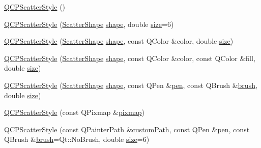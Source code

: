 \begin{DoxyCompactItemize}
\item 
\hyperlink{class_q_c_p_scatter_style_a8836018d9ad83ccd8870de8315c1be73}{Q\+C\+P\+Scatter\+Style} ()
\item 
\hyperlink{class_q_c_p_scatter_style_a003d92f74f4561eda111862eadd62f28}{Q\+C\+P\+Scatter\+Style} (\hyperlink{class_q_c_p_scatter_style_adb31525af6b680e6f1b7472e43859349}{Scatter\+Shape} \hyperlink{class_q_c_p_scatter_style_a4462a25ef17769631f4e0aa81dadca4b}{shape}, double \hyperlink{class_q_c_p_scatter_style_a1973ee650368f1c5f55507b78473f634}{size}=6)
\item 
\hyperlink{class_q_c_p_scatter_style_afa059da858c864c7e05871dc602d7eab}{Q\+C\+P\+Scatter\+Style} (\hyperlink{class_q_c_p_scatter_style_adb31525af6b680e6f1b7472e43859349}{Scatter\+Shape} \hyperlink{class_q_c_p_scatter_style_a4462a25ef17769631f4e0aa81dadca4b}{shape}, const Q\+Color \&color, double \hyperlink{class_q_c_p_scatter_style_a1973ee650368f1c5f55507b78473f634}{size})
\item 
\hyperlink{class_q_c_p_scatter_style_a6e1b64f12cac7f07af180ae4316fd38d}{Q\+C\+P\+Scatter\+Style} (\hyperlink{class_q_c_p_scatter_style_adb31525af6b680e6f1b7472e43859349}{Scatter\+Shape} \hyperlink{class_q_c_p_scatter_style_a4462a25ef17769631f4e0aa81dadca4b}{shape}, const Q\+Color \&color, const Q\+Color \&fill, double \hyperlink{class_q_c_p_scatter_style_a1973ee650368f1c5f55507b78473f634}{size})
\item 
\hyperlink{class_q_c_p_scatter_style_a85acc4941d7e5c9bca5fa51377a77f49}{Q\+C\+P\+Scatter\+Style} (\hyperlink{class_q_c_p_scatter_style_adb31525af6b680e6f1b7472e43859349}{Scatter\+Shape} \hyperlink{class_q_c_p_scatter_style_a4462a25ef17769631f4e0aa81dadca4b}{shape}, const Q\+Pen \&\hyperlink{class_q_c_p_scatter_style_a3c24c3bf37b561b4807aed9f1418ab58}{pen}, const Q\+Brush \&\hyperlink{class_q_c_p_scatter_style_a46bf481d84bfa31b287dd43a3bf86d37}{brush}, double \hyperlink{class_q_c_p_scatter_style_a1973ee650368f1c5f55507b78473f634}{size})
\item 
\hyperlink{class_q_c_p_scatter_style_a63962094587a4c2258435aa7933996cc}{Q\+C\+P\+Scatter\+Style} (const Q\+Pixmap \&\hyperlink{class_q_c_p_scatter_style_a9bab44cc41fcd585621a4b3e0e48231b}{pixmap})
\item 
\hyperlink{class_q_c_p_scatter_style_a879c30647683b3cfbde2afecea815e6f}{Q\+C\+P\+Scatter\+Style} (const Q\+Painter\+Path \&\hyperlink{class_q_c_p_scatter_style_a4dd4998dfb0d6889205668a06c790328}{custom\+Path}, const Q\+Pen \&\hyperlink{class_q_c_p_scatter_style_a3c24c3bf37b561b4807aed9f1418ab58}{pen}, const Q\+Brush \&\hyperlink{class_q_c_p_scatter_style_a46bf481d84bfa31b287dd43a3bf86d37}{brush}=Qt\+::\+No\+Brush, double \hyperlink{class_q_c_p_scatter_style_a1973ee650368f1c5f55507b78473f634}{size}=6)

\end{DoxyCompactItemize}
